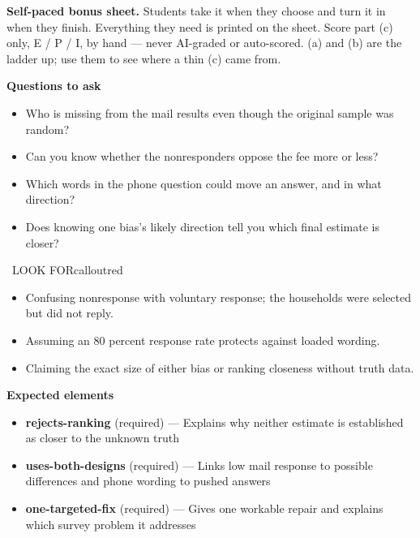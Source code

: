 \documentclass[11pt]{article}
\begin{document}
\textbf{Self-paced bonus sheet.} Students take it when they choose and turn it in when they finish. Everything they need is printed on the sheet. Score part (c) only, E / P / I, by hand --- never AI-graded or auto-scored. (a) and (b) are the ladder up; use them to see where a thin (c) came from.\par

\textbf{Questions to ask}
\begin{itemize}[leftmargin=1.5em,itemsep=2pt,topsep=2pt]
  \item Who is missing from the mail results even though the original sample was random?
  \item Can you know whether the nonresponders oppose the fee more or less?
  \item Which words in the phone question could move an answer, and in what direction?
  \item Does knowing one bias's likely direction tell you which final estimate is closer?
\end{itemize}

\begin{callout}{\IconWarn\ LOOK FOR}{calloutred}
\begin{itemize}[leftmargin=1.5em,itemsep=2pt,topsep=2pt]
  \item Confusing nonresponse with voluntary response; the households were selected but did not reply.
  \item Assuming an 80 percent response rate protects against loaded wording.
  \item Claiming the exact size of either bias or ranking closeness without truth data.
\end{itemize}
\end{callout}


\textbf{Expected elements}
\begin{itemize}[leftmargin=1.5em,itemsep=2pt,topsep=2pt]
  \item \textbf{rejects-ranking} (required) --- Explains why neither estimate is established as closer to the unknown truth
  \item \textbf{uses-both-designs} (required) --- Links low mail response to possible differences and phone wording to pushed answers
  \item \textbf{one-targeted-fix} (required) --- Gives one workable repair and explains which survey problem it addresses
\end{itemize}
\end{document}
